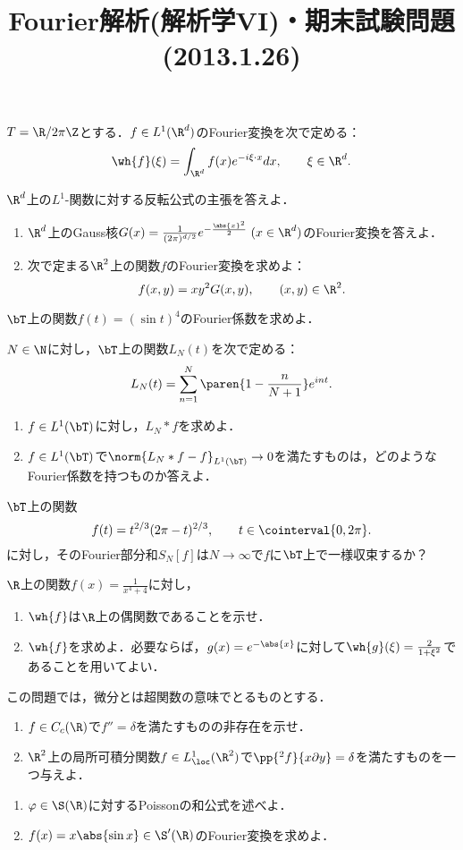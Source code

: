\documentclass[uplatex,dvipdfmx]{jsarticle}
\title{Fourier解析(解析学VI)・期末試験問題 (2013.1.26)}
\author{}
\begin{document}
$T=\R/2\pi\Z$とする．$f\in L^1(\R^d)$のFourier変換を次で定める：
\[\wh{f}(\xi)=\int_{\R^d}f(x)e^{-i\xi\cdot x}dx,\qquad\xi\in\R^d.\]
\begin{enumerate}[{[}1{]}]
    \item $\R^d$上の$L^1$-関数に対する反転公式の主張を答えよ．
    \item \begin{enumerate}
        \item $\R^d$上のGauss核$G(x)=\frac{1}{(2\pi)^{d/2}}e^{-\frac{\abs{x}^2}{2}}\;(x\in\R^d)$のFourier変換を答えよ．
        \item 次で定まる$\R^2$上の関数$f$のFourier変換を求めよ：
        \[f(x,y)=xy^2G(x,y),\qquad(x,y)\in\R^2.\]
    \end{enumerate}
    \item $\bT$上の関数$f(t)=(\sin t)^4$のFourier係数を求めよ．
    \item $N\in\N$に対し，$\bT$上の関数$L_N(t)$を次で定める：
    \[L_N(t)=\sum_{n=1}^N\paren{1-\frac{n}{N+1}}e^{int}.\]
    \begin{enumerate}
        \item $f\in L^1(\bT)$に対し，$L_N*f$を求めよ．
        \item $f\in L^1(\bT)$で$\norm{L_N*f-f}_{L^1(\bT)}\to0$を満たすものは，どのようなFourier係数を持つものか答えよ．
    \end{enumerate}
    \item $\bT$上の関数
    \[f(t)=t^{2/3}(2\pi-t)^{2/3},\qquad t\in\cointerval{0,2\pi}.\]
    に対し，そのFourier部分和$S_N[f]$は$N\to\infty$で$f$に$\bT$上で一様収束するか？
    \item $\R$上の関数$f(x)=\frac{1}{x^4+4}$に対し，
    \begin{enumerate}
        \item $\wh{f}$は$\R$上の偶関数であることを示せ．
        \item $\wh{f}$を求めよ．必要ならば，$g(x)=e^{-\abs{x}}$に対して$\wh{g}(\xi)=\frac{2}{1+\xi^2}$であることを用いてよい．
    \end{enumerate}
    \item この問題では，微分とは超関数の意味でとるものとする．
    \begin{enumerate}
        \item $f\in C_c(\R)$で$f''=\delta$を満たすものの非存在を示せ．
        \item $\R^2$上の局所可積分関数$f\in L^1_\loc(\R^2)$で$\pp{^2f}{x\partial y}=\delta$を満たすものを一つ与えよ．
    \end{enumerate}
    \item \begin{enumerate}
        \item $\varphi\in\S(\R)$に対するPoissonの和公式を述べよ．
        \item $f(x)=x\abs{\sin x}\in\S'(\R)$のFourier変換を求めよ．
    \end{enumerate}
\end{enumerate}
\end{document}
